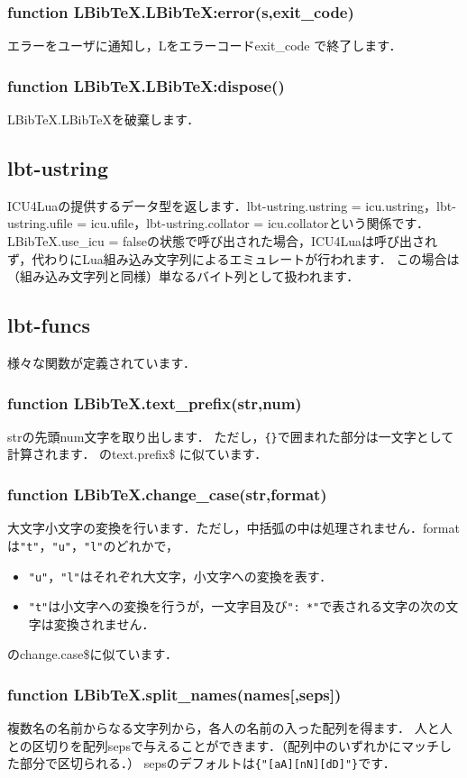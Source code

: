 \documentclass[dvipdfmx,a4paper]{jsarticle}
\DeclareRobustCommand{\LBibTeX}{L\BibTeX}
\begin{document}
\subsubsection{function LBibTeX.LBibTeX:error(s,exit\_code)}
エラーをユーザに通知し，\LBibTeX をエラーコードexit\_code で終了します．

\subsubsection{function LBibTeX.LBibTeX:dispose()}
LBibTeX.LBibTeXを破棄します．

\subsection{lbt-ustring}
ICU4Luaの提供するデータ型を返します．lbt-ustring.ustring = icu.ustring，lbt-ustring.ufile = icu.ufile，lbt-ustring.collator = icu.collatorという関係です．
LBibTeX.use\_icu = falseの状態で呼び出された場合，ICU4Luaは呼び出されず，代わりにLua組み込み文字列によるエミュレートが行われます．
この場合は（組み込み文字列と同様）単なるバイト列として扱われます．

\subsection{lbt-funcs}
様々な関数が定義されています．
\subsubsection{function LBibTeX.text\_prefix(str,num)}
strの先頭num文字を取り出します．
ただし，\verb|{}|で囲まれた部分は一文字として計算されます．
\BibTeX のtext.prefix\$ に似ています．

\subsubsection{function LBibTeX.change\_case(str,format)}
大文字小文字の変換を行います．ただし，中括弧の中は処理されません．formatは\verb|"t"|，\verb|"u"|，\verb|"l"|のどれかで，
\begin{itemize}
\item \verb|"u"|，\verb|"l"|はそれぞれ大文字，小文字への変換を表す．
\item \verb|"t"|は小文字への変換を行うが，一文字目及び\verb|": *"|で表される文字の次の文字は変換されません．
\end{itemize}
\BibTeX のchange.case\$に似ています．

\subsubsection{function LBibTeX.split\_names(names[,seps])}
複数名の名前からなる文字列から，各人の名前の入った配列を得ます．
人と人との区切りを配列sepsで与えることができます．（配列中のいずれかにマッチした部分で区切られる．）
sepsのデフォルトは\verb|{"[aA][nN][dD]"}|です．
\end{document}
